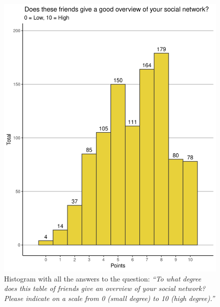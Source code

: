     \begin{figure}[ht]
        \centering
            \includegraphics[width=0.55\linewidth]{figures/Methodology/Histogram_completeTable_Overview.png} 
        \caption{Histogram with all the answers to the question: \textit{“To what degree does this table of friends give an overview of your social network? Please indicate on a scale from 0 (small degree) to 10 (high degree).”}}
        \label{figure:networksRepresentative}
    \end{figure}



\begin{table}[ht!]

    \caption{Summary of lost connections at data cleaning.}

    \centering

    \label{table:SummaryLost}

 	\renewcommand{\arraystretch}{1.5} 


\end{table}

